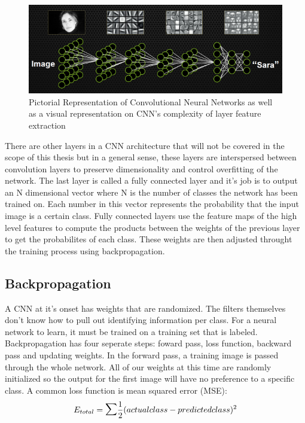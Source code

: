 \begin{figure}[h!]
\centering
\includegraphics[width=.9\linewidth]{figs/facialDetection.png}
\caption{Pictorial Representation of Convolutional Neural Networks as well as a visual representation on CNN's complexity of layer feature extraction}
\label{fig:featuremaps}
\end{figure}
There are other layers in a CNN architecture that will not be covered in the scope of this thesis but in a general sense, these layers are interspersed between convolution layers to preserve dimensionality and control overfitting of the network. The last layer is called a fully connected layer and it's job is to output an N dimensional vector where N is the number of classes the network has been trained on. Each number in this vector represents the probability that the input image is a certain class. Fully connected layers use the feature maps of the high level features to compute the products between the weights of the previous layer to get the probabilites of each class. These weights are then adjusted throught the training process using backpropagation. 

\subsection{Backpropagation}
A CNN at it's onset has weights that are randomized. The filters themselves don't know how to pull out identifying information per class. For a neural network to learn, it must be trained on a training set that is labeled. Backpropagation has four seperate steps: foward pass, loss function, backward pass and updating weights. In the forward pass, a training image is passed through the whole network. All of our weights at this time are randomly initialized so the output for the first image will have no preference to a specific class. A common loss function is mean squared error (MSE): 
\begin{equation}
E_{total} = \mathlarger{\mathlarger{\sum}}\frac{1}{2}(actual class -predicted class)^2 
\end{equation}

